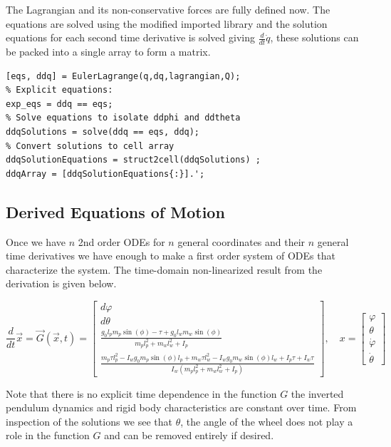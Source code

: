 \documentclass[11pt]{article}
\begin{document}
The Lagrangian and its non-conservative forces are fully defined now. The equations are solved using the modified imported library and the solution equations for each second time derivative is solved giving $\frac{d}{dt}\dot{q}$, these solutions can be packed into a single array to form a matrix. 

\begin{lstlisting}[caption={MATLAB Code}, label={lst:matlab_code}]
% Derive the equations of motion for each ddq
[eqs, ddq] = EulerLagrange(q,dq,lagrangian,Q);
% Explicit equations:
exp_eqs = ddq == eqs;
% Solve equations to isolate ddphi and ddtheta
ddqSolutions = solve(ddq == eqs, ddq);
% Convert solutions to cell array
ddqSolutionEquations = struct2cell(ddqSolutions) ;
ddqArray = [ddqSolutionEquations{:}].';
\end{lstlisting}

\subsection{Derived Equations of Motion}
Once we have $n$ 2nd order ODEs for $n$  general coordinates and their $n$ general time derivatives we have enough to make a first order system of ODEs that characterize the system.
The time-domain non-linearized result from the derivation is given below.

$$\frac{d}{dt}\vec{x} = \vec{G}(\vec{x}, t) = \begin{bmatrix}
d\varphi \\
d\theta \\
\frac{g_0 l_p m_p \sin(\phi) - \tau + g_0 l_w m_w \sin(\phi)}{m_p l_p^2 + m_w l_w^2 + I_p} \\
\frac{m_p \tau l_p^2 - I_w g_0 m_p \sin(\phi) l_p + m_w \tau l_w^2 - I_w g_0 m_w \sin(\phi) l_w + I_p \tau + I_w \tau}{I_w (m_p l_p^2 + m_w l_w^2 + I_p)}
\end{bmatrix}, \quad x = \begin{bmatrix}
\varphi \\ \theta \\ \dot{\varphi} \\ \dot{\theta}
\end{bmatrix}
$$

Note that there is no explicit time dependence in the function $G$ the inverted pendulum dynamics and rigid body characteristics are constant over time. From inspection of the solutions we see that $\theta$, the angle of the wheel does not play a role in the function $G$ and can be removed entirely if desired. 
\end{document}
